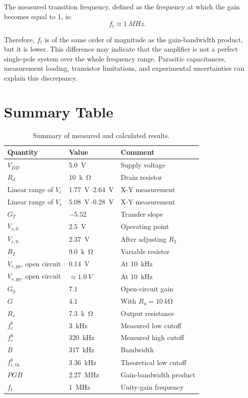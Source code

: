 \documentclass[11pt,a4paper]{article}
\begin{document}
The measured transition frequency, defined as the frequency at which the gain becomes equal to 1, is:
\[
f_t\approx \SI{1}{MHz}.
\]

Therefore, $f_t$ is of the same order of magnitude as the gain-bandwidth product, but it is lower. This difference may indicate that the amplifier is not a perfect single-pole system over the whole frequency range. Parasitic capacitances, measurement loading, transistor limitations, and experimental uncertainties can explain this discrepancy.

\section{Summary Table}

\begin{table}[H]
\centering
\begin{tabular}{lll}
\toprule
Quantity & Value & Comment \\
\midrule
$V_{DD}$ & \SI{5.0}{V} & Supply voltage \\
$R_d$ & \SI{10}{k\ohm} & Drain resistor \\
Linear range of $V_e$ & \SI{1.77}{V}--\SI{2.64}{V} & X-Y measurement \\
Linear range of $V_s$ & \SI{5.08}{V}--\SI{0.28}{V} & X-Y measurement \\
$G_T$ & $-5.52$ & Transfer slope \\
$V_{s,0}$ & \SI{2.5}{V} & Operating point \\
$V_{e,0}$ & \SI{2.37}{V} & After adjusting $R_2$ \\
$R_2$ & \SI{9.0}{k\ohm} & Variable resistor \\
$V_{e,pp}$, open circuit & \SI{0.14}{V} & At \SI{10}{kHz} \\
$V_{s,pp}$, open circuit & $\approx\SI{1.0}{V}$ & At \SI{10}{kHz} \\
$G_0$ & $7.1$ & Open-circuit gain \\
$G$ & $4.1$ & With $R_u=\SI{10}{k\ohm}$ \\
$R_s$ & \SI{7.3}{k\ohm} & Output resistance \\
$f_c^b$ & \SI{3}{kHz} & Measured low cutoff \\
$f_c^h$ & \SI{320}{kHz} & Measured high cutoff \\
$B$ & \SI{317}{kHz} & Bandwidth \\
$f_{c,\mathrm{th}}^b$ & \SI{3.36}{kHz} & Theoretical low cutoff \\
$PGB$ & \SI{2.27}{MHz} & Gain-bandwidth product \\
$f_t$ & \SI{1}{MHz} & Unity-gain frequency \\
\bottomrule
\end{tabular}
\caption{Summary of measured and calculated results.}
\end{table}
\end{document}
